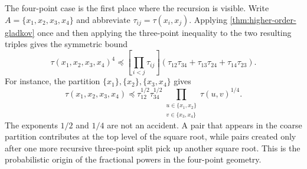 \documentclass[11pt,reqno]{book}
\numberwithin{equation}{chapter}
\theoremstyle{plain}
\theoremstyle{definition}
\theoremstyle{remark}
\newcommand{\1}{\mathbf 1}
\newcommand{\pre}{\preceq}
\begin{document}
The four-point case is the first place where the recursion is visible. Write
\(A=\{x_1,x_2,x_3,x_4\}\) and abbreviate
\(\tau_{ij}=\tau(x_i,x_j)\). Applying
\cref{thm:higher-order-gladkov} once and then applying the three-point
inequality to the two resulting triples gives the symmetric bound
\[
  \tau(x_1,x_2,x_3,x_4)^4
  \pre
  \left[\prod_{i<j}\tau_{ij}\right]
  \left(
    \tau_{12}\tau_{34}
    +\tau_{13}\tau_{24}
    +\tau_{14}\tau_{23}
  \right).
\]
For instance, the partition \(\{x_1\},\{x_2\},\{x_3,x_4\}\) gives
\[
  \tau(x_1,x_2,x_3,x_4)
  \pre
  \tau_{12}^{1/2}\tau_{34}^{1/2}
  \prod_{\substack{u\in\{x_1,x_2\}\\ v\in\{x_3,x_4\}}}
  \tau(u,v)^{1/4}.
\]
The exponents \(1/2\) and \(1/4\) are not an accident. A pair that appears
in the coarse partition contributes at the top level of the square root,
while pairs created only after one more recursive three-point split pick up
another square root. This is the probabilistic origin of the fractional
powers in the four-point geometry.
\end{document}
